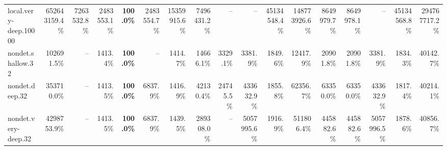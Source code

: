 \documentclass[varwidth,border=2pt]{standalone}
\begin{document}
\begin{center}
{\begin{tabular}{lrrrrrrrrrrrrrrrr}
local.very-deep.10000 & 652643159.4\% & 7263532.8\% & 2483553.1\% & \textbf{100.0\%} & 2483554.7\% & 15359915.6\% & 7496431.2\% & -- & -- & 45134548.4\% & 148773926.6\% & 8649979.7\% & 8649978.1\% & -- & 45134568.8\% & 294767717.2\% \\
nondet.shallow.32 & 102691.5\% & -- & 1413.4\% & \textbf{100.0\%} & -- & 1414.7\% & 14666.1\% & 3329.1\% & 3381.9\% & 1849.6\% & 12417.9\% & 20901.8\% & 20901.8\% & 3381.9\% & 1834.3\% & 40142.7\% \\
nondet.deep.32 & 353710.0\% & -- & 1413.5\% & \textbf{100.0\%} & 6837.9\% & 1416.9\% & 42130.4\% & 24745.5\% & 433632.9\% & 1855.8\% & 62356.7\% & 63350.0\% & 63350.0\% & 433632.9\% & 1817.4\% & 40214.1\% \\
nondet.very-deep.32 & 4298753.9\% & -- & 1413.5\% & \textbf{100.0\%} & 6837.9\% & 1439.5\% & 289308.0\% & -- & 5057995.6\% & 1916.9\% & 511806.4\% & 445882.6\% & 445882.6\% & 5057996.5\% & 1878.6\% & 40856.7\% \\
\bottomrule
\end{tabular}
}
\end{center}
\end{document}
